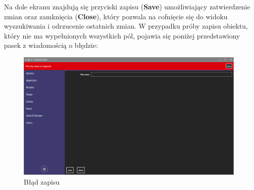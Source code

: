 \documentclass[10pt,a4paper]{article}
\begin{document}
Na dole ekranu znajdują się przyciski zapisu (\textbf{Save}) umożliwiający zatwierdzenie zmian oraz zamknięcia (\textbf{Close}), który pozwala na cofnięcie się do widoku wyszukiwania i odrzucenie ostatnich zmian. W przypadku próby zapisu obiektu, który nie ma wypełnionych wszystkich pól, pojawia się poniżej przedstawiony pasek z wiadomością o błędzie:
\begin{figure}[H]
	\centering
	\includegraphics[width=15cm]{Resources/Images/21_not_all_fields.png}
	\caption{Błąd zapisu}
\end{figure}
\end{document}
